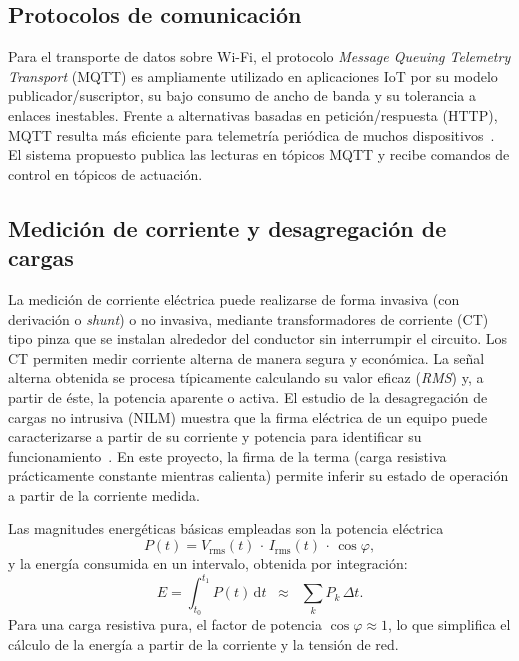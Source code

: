 \documentclass[11pt,a4paper]{article}
\begin{document}
\subsection{Protocolos de comunicación}
Para el transporte de datos sobre Wi-Fi, el protocolo \emph{Message Queuing Telemetry Transport} (MQTT) es ampliamente utilizado en aplicaciones IoT por su modelo publicador/suscriptor, su bajo consumo de ancho de banda y su tolerancia a enlaces inestables. Frente a alternativas basadas en petición/respuesta (HTTP), MQTT resulta más eficiente para telemetría periódica de muchos dispositivos~\cite{alfuqaha2015}. El sistema propuesto publica las lecturas en tópicos MQTT y recibe comandos de control en tópicos de actuación.

\subsection{Medición de corriente y desagregación de cargas}
La medición de corriente eléctrica puede realizarse de forma invasiva (con derivación o \emph{shunt}) o no invasiva, mediante transformadores de corriente (CT) tipo pinza que se instalan alrededor del conductor sin interrumpir el circuito. Los CT permiten medir corriente alterna de manera segura y económica. La señal alterna obtenida se procesa típicamente calculando su valor eficaz (\emph{RMS}) y, a partir de éste, la potencia aparente o activa. El estudio de la desagregación de cargas no intrusiva (NILM) muestra que la firma eléctrica de un equipo puede caracterizarse a partir de su corriente y potencia para identificar su funcionamiento~\cite{zoha2012}. En este proyecto, la firma de la terma (carga resistiva prácticamente constante mientras calienta) permite inferir su estado de operación a partir de la corriente medida.

Las magnitudes energéticas básicas empleadas son la potencia eléctrica
\begin{equation}
P(t) = V_{\mathrm{rms}}(t)\,\cdot\, I_{\mathrm{rms}}(t)\,\cdot\, \cos\varphi ,
\end{equation}
y la energía consumida en un intervalo, obtenida por integración:
\begin{equation}
E = \int_{t_0}^{t_1} P(t)\,\mathrm{d}t \;\;\approx\;\; \sum_{k} P_k \,\Delta t .
\end{equation}
Para una carga resistiva pura, el factor de potencia $\cos\varphi \approx 1$, lo que simplifica el cálculo de la energía a partir de la corriente y la tensión de red.
\end{document}
